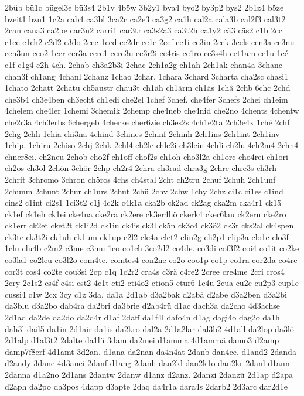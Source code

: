 {2büb
bü1c
bügel3e
bü3s4
2b1v
4b5w
3b2y1
bya4
byo2
by3p2
bys2
2b1z4
b5ze
bzeit1
bzu1
1c2a
cab4
ca3bl
3ca2c
ca2e3
ca3g2
ca1h
cal2a
cala3b
cal2f3
cal3t2
2can
cana3
ca2pe
car3n2
carri1
car3tr
ca3s2a3
ca3t2h
ca1y2
cä3
cäs2
c1b
2cc
c1ce
c1ch2
c2d2
c3do
2cec
1ced
ce2dr
ce1e
2cef
ce1i
ce3in
2cek
3cels
cen3a
ce3nu
cen3un
ceo2
1cer
cer3a
cere1
cere3u
ce3r2i
ce4ris
ce1ro
ce3s4h
cet1am
ce1u
1cé
c1f
c1g4
c2h
4ch.
2chab
ch3a2b3i
2chac
2ch1a2g
ch1ah
2ch1ak
chan4a
3chanc
chan3f
ch1ang
4chanl
2chanz
1chao
2char.
1chara
3chard
3charta
cha2sc
chasi1
1chato
2chatt
2chatu
ch5austr
chau3t
ch1äh
ch1ärm
ch1äs
1châ
2chb
6chc
2chd
che3b4
ch3e4ben
ch3echt
ch1edi
che2el
1chef
3chef.
che4fer
3chefs
2chei
ch1eim
4chelem
che4ler
1chemi
3chemik
2chemp
che4neb
che4nid
che2no
4chents
4chentw
che2r3a
4ch3erbs
6chergeb
4cherke
cher6zie
ch3es2s
4ch1e2ta
2ch3e4x
1ché
2chf
2chg
2chh
1chia
chi3na
4chind
3chines
2chinf
2chinh
2ch1ins
2ch1int
2ch1inv
1chip.
1chiru
2chiso
2chj
2chk
2chl4
ch2le
chle2i
ch3lein
4chli
ch2lu
4ch2m4
2chn4
chner8ei.
ch2neu
2chob
cho2f
ch1off
chof2s
ch1oh
cho3l2a
ch1orc
cho4rei
ch1ori
ch2os
ch3öl
2chön
3chör
2chp
ch2r4
2chra
ch3rad
chra3g
2chre
chre3s
ch3rh
2chrit
3chromo
3chron
ch5ros
4chs
ch4stal
2cht
ch2tru
2chuf
2chuh
2ch1unf
2chunm
2chunt
2chur
ch1urs
2chut
2chü
2chv
2chw
1chy
2chz
ci1c
ci1es
c1ind
cins2
c1int
ci2s1
1ci3t2
c1j
4c2k
c4k1a
cka2b
ck2ad
ck2ag
cka2m
cka4r1
ck1ä
ck1ef
ck1eh
ck1ei
cke4na
cke2ra
ck2ere
ck3er4hö
ckerk4
cker6lau
ck2ern
cke2ro
ck1err
ck2et
cket2t
ck1i2d
ck1in
ck4is
ck3l
ck5n
ck3o4
ck3ö2
ck3r
cks2al
ck4spen
ck3te
ck3t2i
ck1uh
ck1um
ck1up
c2l2
cle4a
clet2
clin2g
cli2p1
clip3a
clo1c
clo3f
1clu
clu4b
c2m2
c3me
c3mu
1co
co1ch
3co2d2
co4de.
co3di
cof3f2
coi4
co1it
co2ke
co3la1
co2leu
co3l2o
com4te.
comtes4
con2ne
co2o
coo1p
co1p
co1ra
cor2da
co4re
cor3t
cos4
co2te
cou3si
2cp
c1q
1c2r2
cra4s
c3rä
c4re2
2cree
cre4me
2cri
cros4
2cry
2c1s2
cs4f
c4si
cst2
4c1t
cti2
cti4o2
ction5
ctur6
1c4u
2cua
cu2e
cu2p3
cup1e
cussi4
c1w
2cx
3cy
c1z
3da.
da1a
2d1ab
d3a2bak
d2abä
d2abe
d3a2ben
d3a2bi
da3blu
d3a2bo
dab4ra
da2bri
da3brie
d2ab4rü
d1ac
dach3a
da2cho
4d3achse
2d1ad
da2de
da2do
da2d4r
d1af
2daff
da1f4l
dafo4n
d1ag
dagi4o
dag2o
da1h
dah3l
dail5
da1in
2d1air
da1is
da2kro
dal2a
2d1a2lar
dal3b2
4d1all
da2lop
da3lö
2d1alp
d1al3t2
2dalte
da1lü
3dam
da2mei
d1amma
4d1ammä
damo3
d2amp
damp7f8erf
4d1amt
3d2an.
d1ana
da2nan
da4n4at
2danb
dan4ce.
d1and2
2danda
d2andy
3dane
4d3anei
2danf
d1ang
2danh
dan2kl
dan2k1o
dan2kr
2danl
d1ann
2danna
d1a2no
2d1ans
2dantw
2danw
d1anz
d2anz.
2danzi
2danzü
2d1ap
d2apa
d2aph
da2po
da3pos
4dapp
d3apte
2daq
da4r1a
dara4s
2darb2
2d3arc
dar2d1e
}
